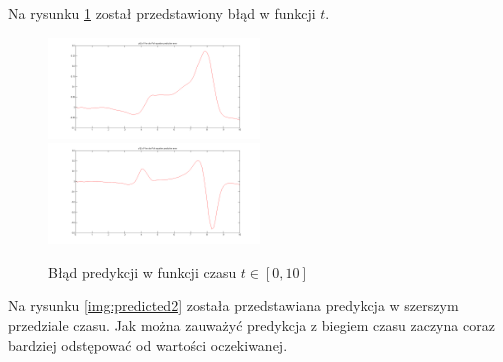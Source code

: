Na rysunku \ref{img:err} został przedstawiony błąd w funkcji $t$.

\begin{figure}[ht!]
	\centering

	\subfloat
	{\includegraphics[width=0.5\textwidth]
	{images/err100_x1.png}}
	\subfloat
	{\includegraphics[width=0.5\textwidth]
	{images/err100_x2.png}}	
	

	\caption{Błąd predykcji w funkcji czasu $t \in [0,10]$}
	\label{img:err}
\end{figure}


Na rysunku \ref{img:predicted2} została przedstawiana predykcja w szerszym przedziale czasu. Jak można zauważyć predykcja z biegiem czasu zaczyna coraz bardziej odstępować od wartości oczekiwanej.

